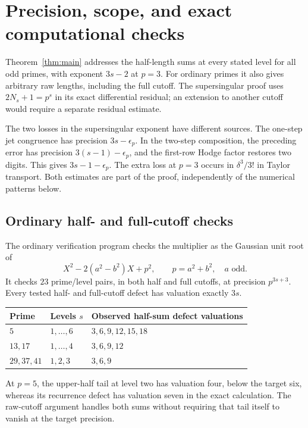 \documentclass[11pt,a4paper]{article}
\begin{document}
\section{Precision, scope, and exact computational checks}\label{sec:checks}

Theorem~\ref{thm:main} addresses the half-length sums at every stated
level for all odd primes, with exponent $3s-2$ at $p=3$.
For ordinary primes it also gives arbitrary raw lengths, including
the full cutoff. The supersingular proof uses
$2N_s+1=p^s$ in its exact differential residual; an extension to another
cutoff would require a separate residual estimate.

The two losses in the supersingular exponent have different sources.
The one-step jet congruence has precision $3s-\epsilon_p$.
In the two-step composition, the preceding error has precision
$3(s-1)-\epsilon_p$, and the first-row Hodge factor restores two digits.
This gives $3s-1-\epsilon_p$. The extra loss at $p=3$ occurs in
$\delta^3/3!$ in Taylor transport. Both estimates are part of the
proof, independently of the numerical patterns below.

\subsection{Ordinary half- and full-cutoff checks}

The ordinary verification program checks the multiplier as the
Gaussian unit root of
\[
 X^2-2(a^2-b^2)X+p^2,
 \qquad p=a^2+b^2,\quad a\text{ odd}.
\]
It checks $23$ prime/level pairs, in both half and full cutoffs,
at precision $p^{3s+3}$. Every tested half- and full-cutoff defect
has valuation exactly $3s$.
\begin{center}
\begin{tabular}{@{}lll@{}}\toprule
Prime & Levels $s$ & Observed half-sum defect valuations\\\midrule
$5$ & $1,\ldots,6$ & $3,6,9,12,15,18$\\
$13,17$ & $1,\ldots,4$ & $3,6,9,12$\\
$29,37,41$ & $1,2,3$ & $3,6,9$\\\bottomrule
\end{tabular}
\end{center}
At $p=5$, the upper-half tail at level two has valuation four, below
the target six, whereas its recurrence defect has valuation seven
in the exact calculation. The raw-cutoff argument handles both sums
without requiring that tail itself to vanish at the target precision.
\end{document}
